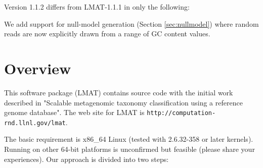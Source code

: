 \documentclass[11pt]{article}
\begin{document}
Version 1.1.2 differs from LMAT-1.1.1 in only the following:

We add support for null-model generation (Section \ref{sec:nullmodel})
where random reads are now explicitly drawn from a range of GC content
values.


\section{Overview}

This software package (LMAT) contains source code with the initial work described in
"Scalable metagenomic taxonomy classification using a reference genome 
database".   
     The web site for LMAT is \texttt{http://computation-rnd.llnl.gov/lmat}.  
     
The basic requirement is x86\_64 Linux (tested with 2.6.32-358 or later kernels).  Running on other 64-bit platforms is unconfirmed but feasible (please share your experiences).
Our approach is divided into two steps:
\end{document}
